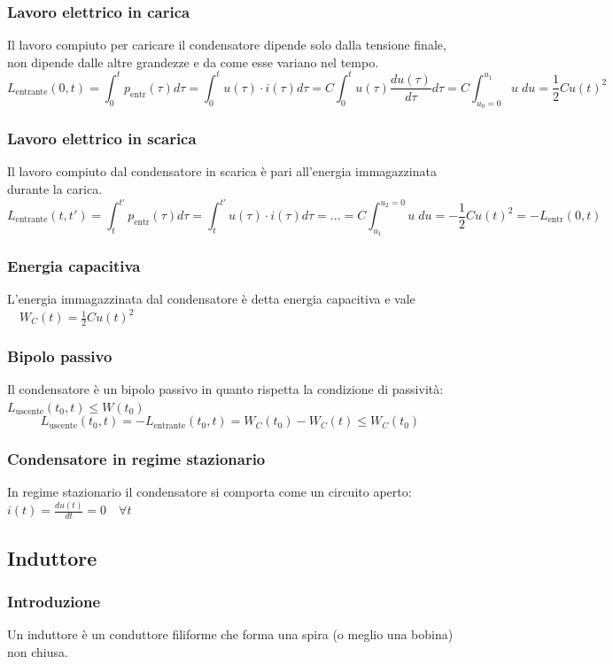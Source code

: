 \documentclass[a4paper]{article}
\begin{document}
\subsubsection*{Lavoro elettrico in carica}
Il lavoro compiuto per caricare il condensatore dipende solo dalla tensione finale, non dipende dalle altre grandezze e da come
esse variano nel tempo.
\[L_\text{entrante}(0,t) = \int_0^t p_\text{entr}(\tau) d\tau = \int_0^t u(\tau) \cdot i(\tau) d\tau = C \int_0^t u(\tau) \frac{d u(\tau)}{d\tau} d\tau = C \int_{u_0=0}^{u_1} u \; du = \frac{1}{2}Cu(t)^2\]

\subsubsection*{Lavoro elettrico in scarica}
Il lavoro compiuto dal condensatore in scarica è pari all'energia immagazzinata durante la carica.
\[L_\text{entrante}(t,t') = \int_t^{t'} p_\text{entr}(\tau) d\tau = \int_t^{t'} u(\tau) \cdot i(\tau) d\tau = \dots = C \int_{u_1}^{u_2=0} u \; du = -\frac{1}{2}Cu(t)^2 = -L_\text{entr}(0,t)\]

\subsubsection*{Energia capacitiva}
L'energia immagazzinata dal condensatore è detta energia capacitiva e vale \(\quad\displaystyle W_C(t) = \frac{1}{2} C u(t)^2\)

\subsubsection*{Bipolo passivo}
Il condensatore è un bipolo passivo in quanto rispetta la condizione di passività: \(L_\text{uscente}(t_0,t) \leq W(t_0)\)
\[L_\text{uscente}(t_0,t) = -L_\text{entrante}(t_0,t) = W_C(t_0)-W_C(t) \leq W_C(t_0)\]

\subsubsection*{Condensatore in regime stazionario}
In regime stazionario il condensatore si comporta come un circuito aperto: \(\displaystyle i(t) = \frac{d u(t)}{dt} = 0 \quad \forall t\)

\subsection{Induttore}
\subsubsection*{Introduzione}
Un induttore è un conduttore filiforme che forma una spira (o meglio una bobina) non chiusa.
\end{document}
